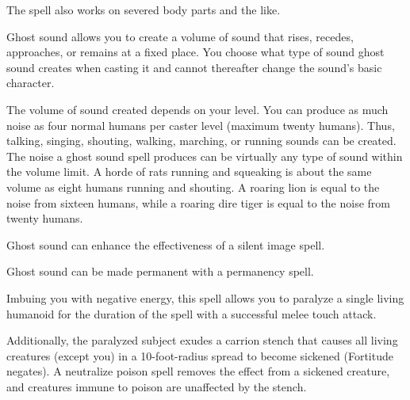 \begin{multicols}{2}
\begin{small}
\smallskip\noindent The spell also works on severed body parts and the like.


\noindent Ghost sound allows you to create a volume of sound that rises, recedes, approaches, or remains at a fixed place. You choose what type of sound ghost sound creates when casting it and cannot thereafter change the sound's basic character.

\smallskip\noindent The volume of sound created depends on your level. You can produce as much noise as four normal humans per caster level (maximum twenty humans). Thus, talking, singing, shouting, walking, marching, or running sounds can be created. The noise a ghost sound spell produces can be virtually any type of sound within the volume limit. A horde of rats running and squeaking is about the same volume as eight humans running and shouting. A roaring lion is equal to the noise from sixteen humans, while a roaring dire tiger is equal to the noise from twenty humans.

\smallskip\noindent Ghost sound can enhance the effectiveness of a silent image spell.

\smallskip\noindent Ghost sound can be made permanent with a permanency spell.


\noindent Imbuing you with negative energy, this spell allows you to paralyze a single living humanoid for the duration of the spell with a successful melee touch attack.

\smallskip\noindent Additionally, the paralyzed subject exudes a carrion stench that causes all living creatures (except you) in a 10-foot-radius spread to become sickened (Fortitude negates). A neutralize poison spell removes the effect from a sickened creature, and creatures immune to poison are unaffected by the stench.


\end{small}
\end{multicols}
